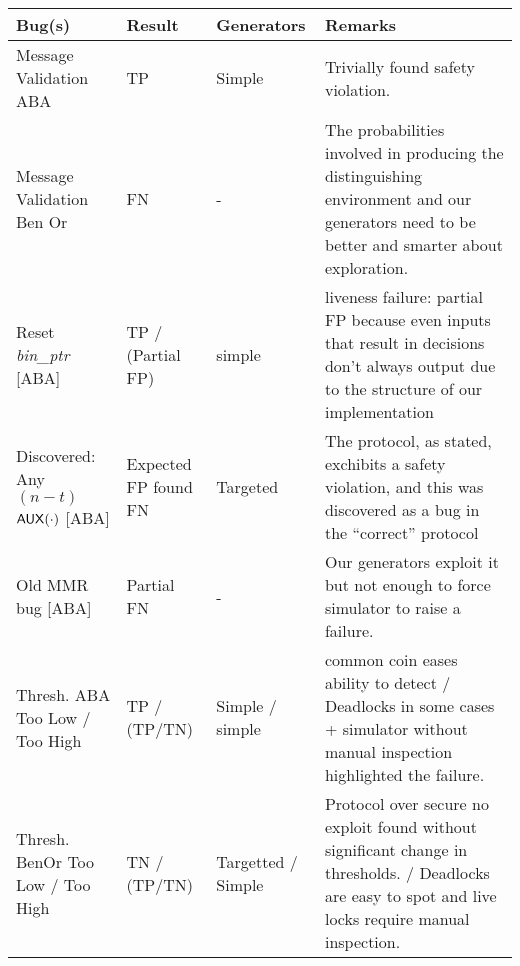 \begin{center}
\begin{tabularx}{\textwidth}{ || p{} | p{} | p{} | p{} || }
\hline \hline
Bug(s) & Result & Generators & Remarks
\\ \hline
Message Validation ABA & TP & Simple  & Trivially found safety violation.
\\ \hline
Message Validation Ben Or & {\color{blue} FN} & - & The probabilities involved in producing the distinguishing environment and our generators need to be better and smarter about exploration.
\\ \hline
Reset \emph{bin\_ptr} [ABA] & TP / (Partial FP) & simple & liveness failure: partial FP because even inputs that result in decisions don't always output due to the structure of our implementation
\\ \hline
{\color{Maroon} Discovered: Any $(n-t)$ ${\mathsf {AUX}}(\cdot)$ [ABA]} & {\color{Maroon} Expected FP found FN} & {\color{Maroon} Targeted}  & {\color{Maroon} The protocol, as stated, exchibits a safety violation, and this was discovered as a bug in the ``correct'' protocol}
\\ \hline
Old MMR bug [ABA] & Partial FN & - & Our generators exploit it but not enough to force simulator to raise a failure.
\\ \hline 
Thresh. ABA Too Low / Too High & TP / (TP/TN) & Simple / simple & common coin eases ability to detect / Deadlocks in some cases + simulator without manual inspection highlighted the failure.
\\ \hline
Thresh. BenOr Too Low / Too High & TN / (TP/TN) & Targetted / Simple & Protocol over secure no exploit found without significant change in thresholds. / Deadlocks are easy to spot and live locks require manual inspection. 
\\ \hline

\end{tabularx}
\end{center}
